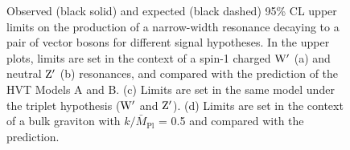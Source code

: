 \begin{figure}[!htb]
\centering
{}
\caption{Observed (black solid) and expected (black dashed) 95\% CL upper limits on the production of a narrow-width resonance decaying to a pair of vector bosons for different signal hypotheses.
In the upper plots, limits are set in the context of a spin-1 charged $\mathrm{W}^\prime$ (a) and neutral $\mathrm{Z}^\prime$ (b) resonances, and compared with the prediction of the HVT Models A and B.
(c) Limits are set in the same model under the triplet hypothesis ($\mathrm{W}^\prime$ and $\mathrm{Z}^\prime$). (d) Limits are set in the context of a bulk graviton with $k/\bar{M}_\mathrm{Pl}$ = 0.5 and compared with the prediction.
}
\label{fig:limitsAsympt-WV}
\end{figure}
